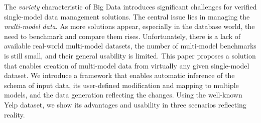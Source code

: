 The \textit{variety} characteristic of Big Data introduces significant challenges for verified single-model data management solutions. The central issue lies in managing the \textit{multi-model data}. As more solutions appear, especially in the data\-base world, the need to benchmark and compare them rises. Unfortunately,  there is a lack of available real-world multi-model datasets, the number of multi-model benchmarks is still small, and their general usability is limited. 
This paper proposes a solution that enables creation of multi-model data from virtually any given single-model dataset. We introduce a framework that enables automatic inference of the schema of input data, its user-defined modification and mapping to multiple models, and the data generation reflecting the changes. Using the well-known Yelp dataset, we show its advantages and usability in three scenarios reflecting reality.




% 

% 
